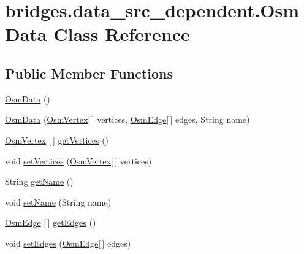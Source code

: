 \hypertarget{classbridges_1_1data__src__dependent_1_1_osm_data}{}\section{bridges.\+data\+\_\+src\+\_\+dependent.\+Osm\+Data Class Reference}
\label{classbridges_1_1data__src__dependent_1_1_osm_data}
\subsection*{Public Member Functions}
\begin{DoxyCompactItemize}
\item 
\mbox{\hyperlink{classbridges_1_1data__src__dependent_1_1_osm_data_a1ba678dfedee33772a620d678f7a04d8}{Osm\+Data}} ()
\item 
\mbox{\hyperlink{classbridges_1_1data__src__dependent_1_1_osm_data_a822667d3269b059bf14e80c36b12fbb9}{Osm\+Data}} (\mbox{\hyperlink{classbridges_1_1data__src__dependent_1_1_osm_vertex}{Osm\+Vertex}}\mbox{[}$\,$\mbox{]} vertices, \mbox{\hyperlink{classbridges_1_1data__src__dependent_1_1_osm_edge}{Osm\+Edge}}\mbox{[}$\,$\mbox{]} edges, String name)
\item 
\mbox{\hyperlink{classbridges_1_1data__src__dependent_1_1_osm_vertex}{Osm\+Vertex}} \mbox{[}$\,$\mbox{]} \mbox{\hyperlink{classbridges_1_1data__src__dependent_1_1_osm_data_a4dc0a205132f1143e628398e08057362}{get\+Vertices}} ()
\item 
void \mbox{\hyperlink{classbridges_1_1data__src__dependent_1_1_osm_data_ad31b467d79dd0b76f75f93b5e192e1e3}{set\+Vertices}} (\mbox{\hyperlink{classbridges_1_1data__src__dependent_1_1_osm_vertex}{Osm\+Vertex}}\mbox{[}$\,$\mbox{]} vertices)
\item 
String \mbox{\hyperlink{classbridges_1_1data__src__dependent_1_1_osm_data_ab239e638adb7cd65a3fc7e735f6d1e61}{get\+Name}} ()
\item 
void \mbox{\hyperlink{classbridges_1_1data__src__dependent_1_1_osm_data_abdc3131be4ca17fcf53a5728a7932bda}{set\+Name}} (String name)
\item 
\mbox{\hyperlink{classbridges_1_1data__src__dependent_1_1_osm_edge}{Osm\+Edge}} \mbox{[}$\,$\mbox{]} \mbox{\hyperlink{classbridges_1_1data__src__dependent_1_1_osm_data_a1ceb1a4b7acd75ca655ad0769f6b427d}{get\+Edges}} ()
\item 
void \mbox{\hyperlink{classbridges_1_1data__src__dependent_1_1_osm_data_a88cf686718bcd27a82e2c8fb74b649f2}{set\+Edges}} (\mbox{\hyperlink{classbridges_1_1data__src__dependent_1_1_osm_edge}{Osm\+Edge}}\mbox{[}$\,$\mbox{]} edges)

\end{DoxyCompactItemize}
